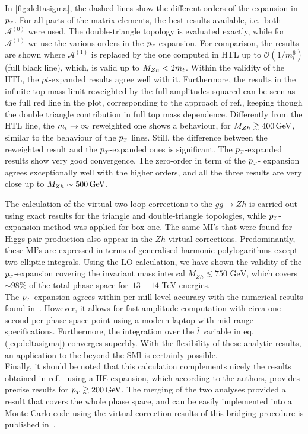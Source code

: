 In \autoref{fig:deltasigma}, the dashed lines show
the different orders of the expansion in $p_{\scriptscriptstyle T}$. 
For all parts of the matrix elements, the best results
available, i.e.~both $\mathcal{A}^{(0)}$ were used. The double-triangle
topology is evaluated exactly, while for
$\mathcal{A}^{(1)}$  we use the various orders in the $p_{\scriptscriptstyle T}$-expansion.
For comparison, the results are shown where
$\mathcal{A}^{(1)}$ is replaced by the one computed in HTL up to
$\mathcal{O}(1/m_t^6)$ (full black line), which, is valid
up to $M_{Zh}< 2 m_t$.  Within the validity of the HTL, the $pt$-expanded
results agree well with it.
Furthermore, the results in the infinite top
mass limit reweighted by the full amplitudes squared can be seen as the full red line in the plot, corresponding to the approach of ref.\cite{Altenkamp:2012sx}, keeping though the double triangle
contribution in full top mass dependence. 
Differently from the HTL line, the $m_t \to \infty$ reweighted one
shows a behaviour, for  $M_{Zh} \gtrsim 400\,\textrm{GeV}$, similar to the behaviour of
the $p_{\scriptscriptstyle T}$ lines. Still,   the difference
between the reweighted result and the $p_{\scriptscriptstyle T}$-expanded ones is significant.
The $p_{\scriptscriptstyle T}$-expanded results show
very good convergence.  The zero-order in term of the $p_{\scriptscriptstyle T}$- expansion agrees
exceptionally well with the higher orders, and all the
three results are very close up to $M_{Zh} \sim 500\,\textrm{GeV}$.
\par  The calculation of the virtual two-loop corrections to the $gg \to Zh$ is carried out using exact results for the triangle and double-triangle topologies, while $p_{\scriptscriptstyle T}$-expansion method was applied for box one.  The same MI's that were found for Higgs pair production \cite{Bonciani:2018omm} also appear in the $Zh$ virtual corrections. Predominantly, these MI's are expressed in terms of generalised harmonic polylogarithms except two elliptic integrals. Using the LO calculation, we have shown the validity of the $p_{\scriptscriptstyle T}$-expansion covering the invariant mass interval  $M_{Zh}\lesssim 750\text{ GeV}$, which covers $\sim 98\%$ of the total phase space for~$13-14$ TeV energies.\\
The $p_{\scriptscriptstyle T}$-expansion agrees within per mill level accuracy with the numerical results found in~\cite{Chen:2020gae}. However, it allows for fast amplitude computation with circa one second per phase space point using a modern laptop with mid-range specifications. Furthermore, the integration over the $\hat{t}$ variable
in eq.(\ref{eq:deltasigma}) converges superbly.  With the flexibility of these analytic
results, an application to the beyond-the SMl is certainly
possible.\\ 
Finally, it should be noted that this calculation complements
nicely the results obtained in ref.~\cite{Davies:2020drs} using a HE
expansion, which according to the authors, provides precise results for
$p_{\scriptscriptstyle T} \gtrsim 200\,\textrm{GeV}$. The merging of the two analyses provided
a result that covers the whole phase space, and can be easily implemented into a
Monte Carlo code using the virtual correction results of this bridging procedure is published in~\cite{Bellafronte:2022jmo}.